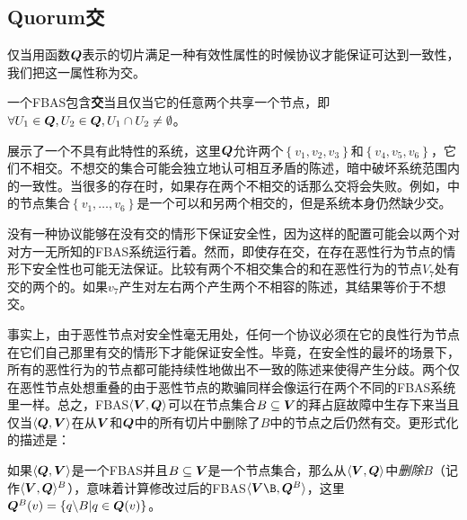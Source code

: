 \subsection{Quorum交}\label{sec:quorum_intersect}

仅当用函数${\bm Q}$表示的{\quorum}切片满足一种有效性属性的时候协议才能保证可达到一致性，我们把这一属性称为{\quorum}交。

\begin{definition}[{\quorum}交]
	一个FBAS包含\textbf{{\quorum}交}当且仅当它的任意两个{\quorum}共享一个节点，即$\forall U_1\in{\bm Q},U_2\in{\bm Q},U_1\cap U_2\neq\emptyset$。
\end{definition}

展示了一个不具有此特性的系统，这里${\bm Q}$允许两个{\quorum}$\left\{v_1,v_2,v_3\right\}$和$\left\{v_4,v_5,v_6\right\}$，它们不相交。不想交的集合可能会独立地认可相互矛盾的陈述，暗中破坏系统范围内的一致性。当很多的{\quorum}存在时，如果存在两个不相交的话那么{\quorum}交将会失败。例如，中的节点集合$\left\{v_1,\ldots ,v_6\right\}$是一个可以和另两个{\quorum}相交的{\quorum}，但是系统本身仍然缺少{\quorum}交。

没有一种协议能够在没有{\quorum}交的情形下保证安全性，因为这样的配置可能会以两个对对方一无所知的FBAS系统运行着。然而，即使存在{\quorum}交，在存在恶性行为节点的情形下安全性也可能无法保证。比较有两个不相交集合的和在恶性行为的节点$V_7$处有交的两个{\quorum}的。如果$v_7$产生对左右两个{\quorum}产生两个不相容的陈述，其结果等价于不想交{\quorum}。

事实上，由于恶性节点对安全性毫无用处，任何一个协议必须在它的良性行为节点在它们自己那里有{\quorum}交的情形下才能保证安全性。毕竟，在安全性的最坏的场景下，所有的恶性行为的节点都可能持续性地做出不一致的陈述来使得{\quorum}产生分歧。两个仅在恶性节点处想重叠的{\quorum}由于恶性节点的欺骗同样会像运行在两个不同的FBAS系统里一样。总之，FBAS$\langle {\bm V},{\bm Q}\rangle$可以在节点集合$B\subseteq {\bm V}$的拜占庭故障中生存下来当且仅当$\langle{\bm Q},{\bm V}\rangle$在从${\bm V}$和${\bm Q}$中的所有切片中删除了$B$中的节点之后仍然有{\quorum}交。更形式化的描述是：

\begin{definition}[删除]
	如果$\langle{\bm Q},{\bm V}\rangle$是一个FBAS并且$B\subseteq {\bm V}$是一个节点集合，那么从$\langle{\bm V},{\bm Q}\rangle$中\textit{删除}$B$（记作$\langle{\bm V},{\bm Q}\rangle^B$），意味着计算修改过后的FBAS$\langle\mybm{V}\B, \mybm{Q}^B\rangle$，这里${\bm Q}^B(v)=\left\{q\backslash B|q\in{\bm Q(v)}\right\}$。
\end{definition}

